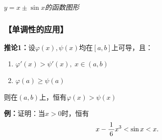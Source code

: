 \begin{center}
	
	{\it $y=x\pm\sin x$的函数图形}
\end{center}

\subsubsection{【单调性的应用】}

{\bf 推论1：}设$\varphi(x),\psi(x) $均在$[a,b]$上可导，且：
\begin{enumerate}[(1)]
  \setlength{\itemindent}{1cm}
  \item $\varphi'(x)>\psi'(x),\;x\in(a,b)$
  \item $\varphi(a)\geq\psi(a)$
\end{enumerate}
则在$(a,b)$上，恒有$\varphi(x)>\psi(x)$

{\bf 例：}证明：当$x>0$时，恒有
$$x-\displaystyle\frac{\,{1}\,}{\,{6}\,}x^3<\sin x<x.$$

\begin{center}
\end{center}

